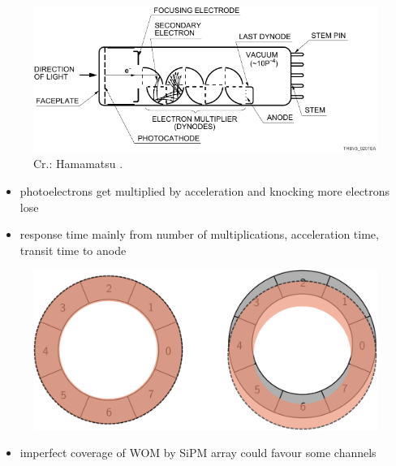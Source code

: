 \documentclass[aspectratio=169]{beamer}
\begin{document}
\begin{frame}
	\begin{figure}
		\includegraphics[width=.7\textwidth]{pictures/photomultiplier.pdf}
		\caption{Cr.: Hamamatsu \cite{HAMAMATSU-PMT}.}
	\end{figure}
\begin{itemize}
	\item photoelectrons get multiplied by acceleration and knocking more electrons lose
	\item response time mainly from number of multiplications, acceleration time, transit time to anode
\end{itemize}
\end{frame}


	
	\begin{frame}
		\begin{figure}
			\includegraphics[width=.5\textwidth]{pictures/coverage.pdf}
		\end{figure}
	\begin{itemize}
		\item imperfect coverage of WOM by SiPM array could favour some channels
	\end{itemize}
	\end{frame}
	
	
\end{document}
